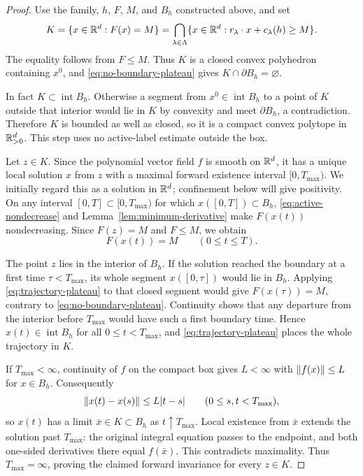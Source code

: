 \begin{proof}
Use the family, $h$, $F$, $M$, and $B_h$ constructed above, and set
\begin{equation}\label{eq:polytope}
 K=\{x\in\mathbb R^d:F(x)=M\}
  =\bigcap_{\lambda\in\Lambda}
    \{x\in\mathbb R^d:r_\lambda\cdot x+c_\lambda(h)\ge M\}.
\end{equation}
The equality follows from $F\le M$. Thus $K$ is a closed convex
polyhedron containing $x^0$, and \eqref{eq:no-boundary-plateau} gives
$K\cap\partial B_h=\varnothing$.

In fact $K\subset\operatorname{int}B_h$. Otherwise a segment from
$x^0\in\operatorname{int}B_h$ to a point of $K$ outside that interior
would lie in $K$ by convexity and meet $\partial B_h$, a contradiction.
Therefore $K$ is bounded as well as closed, so it is a compact convex
polytope in $\mathbb R_{>0}^d$. This step uses no active-label estimate outside
the box.

Let $z\in K$. Since the polynomial vector field $f$ is smooth on
$\mathbb R^d$, it has a unique local solution $x$ from $z$ with a maximal
forward existence interval $[0,T_{\max})$. We initially regard this as
a solution in $\mathbb R^d$; confinement below will give positivity.
On any interval $[0,T]\subset[0,T_{\max})$ for which
$x([0,T])\subset B_h$, \eqref{eq:active-nondecrease} and
Lemma~\ref{lem:minimum-derivative} make $F(x(t))$ nondecreasing.
Since $F(z)=M$ and $F\le M$, we obtain
\begin{equation}\label{eq:trajectory-plateau}
 F(x(t))=M\qquad(0\le t\le T).
\end{equation}

The point $z$ lies in the interior of $B_h$. If the solution reached
the boundary at a first time $\tau<T_{\max}$, its whole segment
$x([0,\tau])$ would lie in $B_h$. Applying
\eqref{eq:trajectory-plateau} to that closed segment would give
$F(x(\tau))=M$, contrary to \eqref{eq:no-boundary-plateau}.
Continuity shows that any departure from the interior before
$T_{\max}$ would have such a first boundary time. Hence
$x(t)\in\operatorname{int}B_h$ for all $0\le t<T_{\max}$, and
\eqref{eq:trajectory-plateau} places the whole trajectory in $K$.

If $T_{\max}<\infty$, continuity of $f$ on the compact box gives
$L<\infty$ with $\lVert f(x)\rVert\le L$ for $x\in B_h$. Consequently
\[
 \lVert x(t)-x(s)\rVert\le L\lvert t-s\rvert
 \qquad(0\le s,t<T_{\max}),
\]
so $x(t)$ has a limit $\bar x\in K\subset B_h$ as
$t\uparrow T_{\max}$. Local existence from $\bar x$ extends the
solution past $T_{\max}$: the original integral equation passes to
the endpoint, and both one-sided derivatives there equal $f(\bar x)$.
This contradicts maximality. Thus $T_{\max}=\infty$, proving the
claimed forward invariance for every $z\in K$.
\end{proof}

